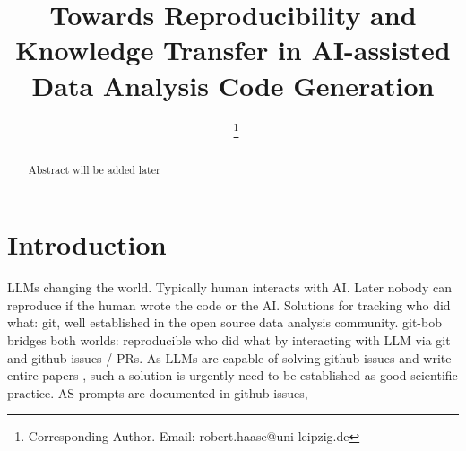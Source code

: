 \documentclass{ecai}
\begin{document}

\begin{frontmatter}




\title{Towards Reproducibility and Knowledge Transfer in AI-assisted Data Analysis Code Generation}


\author[A,B]{~\thanks{Corresponding Author. Email: robert.haase@uni-leipzig.de}}

\address[A]{Data Science Center, Leipzig University, Humboldtstra{\ss}e 25, 04105 Leipzig, Germany}
\address[B]{Center for Scalable Data Analytics and Artificial Intelligence (ScaDS.AI) Dresden / Leipzig}


\begin{abstract}

Abstract will be added later

\end{abstract}

\end{frontmatter}


\section{Introduction}

LLMs changing the world. \citep{Royer2023} \citep{royer2023omega}
Typically human interacts with AI.
Later nobody can reproduce if the human wrote the code or the AI.
Solutions for tracking who did what: git, well established in the open source data analysis community.
git-bob bridges both worlds: reproducible who did what by interacting with LLM via git and github issues / PRs.
As LLMs are capable of solving github-issues \citep{jimenez2024swebenchlanguagemodelsresolve} and write entire papers \citep{lu2024aiscientist}, such a solution is urgently need to be established as good scientific practice.
AS prompts are documented in github-issues, 
\end{document}
